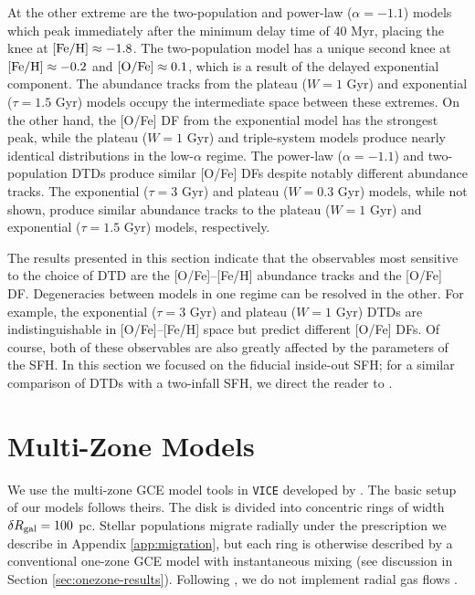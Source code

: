 \documentclass[twocolumn,twocolappendix,linenumbers,trackchanges]{aastex631}
\newcommand{\vice}{{\tt VICE}\xspace}
\begin{document}
At the other extreme are the two-population and power-law ($\alpha=-1.1$) models which peak immediately after the minimum delay time of 40 Myr, placing the knee at ${\rm [Fe/H]}\approx-1.8$. The two-population model has a unique second knee at ${\rm [Fe/H]}\approx-0.2$ and ${\rm [O/Fe]}\approx0.1$, which is a result of the delayed exponential component. The abundance tracks from the plateau ($W=1$ Gyr) and exponential ($\tau=1.5$ Gyr) models occupy the intermediate space between these extremes. On the other hand, the [O/Fe] DF from the exponential model has the strongest peak, while the plateau ($W=1$ Gyr) and triple-system models produce nearly identical distributions in the low-$\alpha$ regime. The power-law ($\alpha=-1.1$) and two-population DTDs produce similar [O/Fe] DFs despite notably different abundance tracks. The exponential ($\tau=3$ Gyr) and plateau ($W=0.3$ Gyr) models, while not shown, produce similar abundance tracks to the plateau ($W=1$ Gyr) and exponential ($\tau=1.5$ Gyr) models, respectively.

The results presented in this section indicate that the observables most sensitive to the choice of DTD are the [O/Fe]--[Fe/H] abundance tracks and the [O/Fe] DF. Degeneracies between models in one regime can be resolved in the other. For example, the exponential ($\tau=3$ Gyr) and plateau ($W=1$ Gyr) DTDs are indistinguishable in [O/Fe]--[Fe/H] space but predict different [O/Fe] DFs. Of course, both of these observables are also greatly affected by the parameters of the SFH. In this section we focused on the fiducial inside-out SFH; for a similar comparison of DTDs with a two-infall SFH, we direct the reader to \citet{Palicio2023-AnalyticDTD}.

\section{Multi-Zone Models}
\label{sec:multizone-results}

We use the multi-zone GCE model tools in \vice developed by . The basic setup of our models follows theirs. The disk is divided into concentric rings of width $\delta R_{\rm gal}=100$ pc. Stellar populations migrate radially under the prescription we describe in Appendix \ref{app:migration}, but each ring is otherwise described by a conventional one-zone GCE model with instantaneous mixing (see discussion in Section \ref{sec:onezone-results}). Following , we do not implement radial gas flows \citep[e.g.,][]{LaceyFall1985-RadialGasFlows,BilitewskiSchonrich2012-RadialFlows}.
\end{document}
